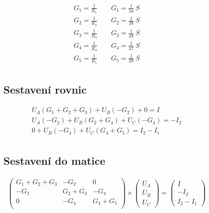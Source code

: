 \begin{figure}[h!]
    \begin{gather*}
        G_{1} = \frac{1}{R_{1}} \quad\quad G_{1} = \frac{1}{50} \:S \\
        G_{2} = \frac{1}{R_{2}} \quad\quad G_{2} = \frac{1}{38} \:S \\
        G_{3} = \frac{1}{R_{3}} \quad\quad G_{3} = \frac{1}{48} \:S \\
        G_{4} = \frac{1}{R_{4}} \quad\quad G_{4} = \frac{1}{37} \:S \\
        G_{5} = \frac{1}{R_{5}} \quad\quad G_{5} = \frac{1}{28} \:S \\
    \end{gather*}
\end{figure}

\begin{figure}[h!]
    \subsection{Sestavení rovnic}
    \begin{gather*}
        U_A (G_1 + G_2 + G_3) + U_B (-G_2) + 0 = I \\
        U_A (-G_2) + U_B (G_2 + G_4) + U_C (-G_4) = -I_2 \\
        0 + U_B (-G_4) + U_C (G_4 + G_5) = I_2 - I_1 \\
    \end{gather*}
\end{figure}

\begin{figure}[h!]
    \subsection{Sestavení do matice}
    \begin{gather*}
        \begin{pmatrix}
            G_1 + G_2 + G_3 & -G_2 & 0 \\
            -G_2 &  G_2 + G_4 & -G_4  \\
            0 & -G_4 & G_4 + G_5 \\
        \end{pmatrix}
        \times
        \begin{pmatrix}
            U_A \\
            U_B \\
            U_C
        \end{pmatrix}
        =
        \begin{pmatrix}
            I \\
            -I_2 \\
            I_2 - I_1
        \end{pmatrix}
    \end{gather*}
\end{figure}

